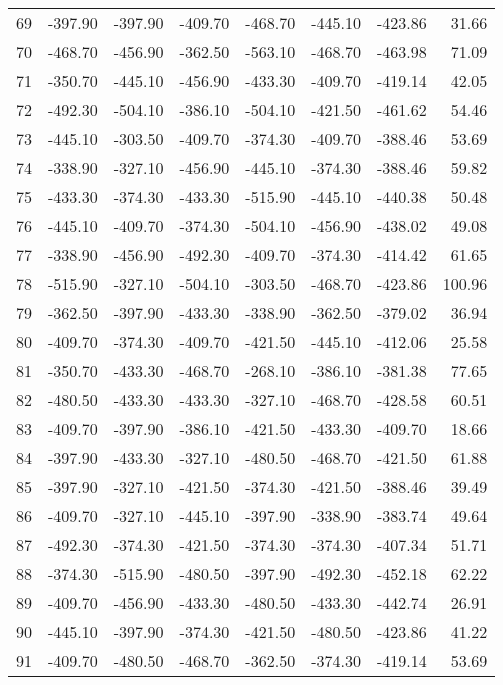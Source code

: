\begin{longtable}{rrrrrrrr}
69 & -397.90 & -397.90 & -409.70 & -468.70 & -445.10 & -423.86 & 31.66  \\
70 & -468.70 & -456.90 & -362.50 & -563.10 & -468.70 & -463.98 & 71.09  \\
71 & -350.70 & -445.10 & -456.90 & -433.30 & -409.70 & -419.14 & 42.05  \\
72 & -492.30 & -504.10 & -386.10 & -504.10 & -421.50 & -461.62 & 54.46  \\
73 & -445.10 & -303.50 & -409.70 & -374.30 & -409.70 & -388.46 & 53.69  \\
74 & -338.90 & -327.10 & -456.90 & -445.10 & -374.30 & -388.46 & 59.82  \\
75 & -433.30 & -374.30 & -433.30 & -515.90 & -445.10 & -440.38 & 50.48  \\
76 & -445.10 & -409.70 & -374.30 & -504.10 & -456.90 & -438.02 & 49.08  \\
77 & -338.90 & -456.90 & -492.30 & -409.70 & -374.30 & -414.42 & 61.65  \\
78 & -515.90 & -327.10 & -504.10 & -303.50 & -468.70 & -423.86 & 100.96  \\
79 & -362.50 & -397.90 & -433.30 & -338.90 & -362.50 & -379.02 & 36.94  \\
80 & -409.70 & -374.30 & -409.70 & -421.50 & -445.10 & -412.06 & 25.58  \\
81 & -350.70 & -433.30 & -468.70 & -268.10 & -386.10 & -381.38 & 77.65  \\
82 & -480.50 & -433.30 & -433.30 & -327.10 & -468.70 & -428.58 & 60.51  \\
83 & -409.70 & -397.90 & -386.10 & -421.50 & -433.30 & -409.70 & 18.66  \\
84 & -397.90 & -433.30 & -327.10 & -480.50 & -468.70 & -421.50 & 61.88  \\
85 & -397.90 & -327.10 & -421.50 & -374.30 & -421.50 & -388.46 & 39.49  \\
86 & -409.70 & -327.10 & -445.10 & -397.90 & -338.90 & -383.74 & 49.64  \\
87 & -492.30 & -374.30 & -421.50 & -374.30 & -374.30 & -407.34 & 51.71  \\
88 & -374.30 & -515.90 & -480.50 & -397.90 & -492.30 & -452.18 & 62.22  \\
89 & -409.70 & -456.90 & -433.30 & -480.50 & -433.30 & -442.74 & 26.91  \\
90 & -445.10 & -397.90 & -374.30 & -421.50 & -480.50 & -423.86 & 41.22  \\
91 & -409.70 & -480.50 & -468.70 & -362.50 & -374.30 & -419.14 & 53.69  \\

\end{longtable}
